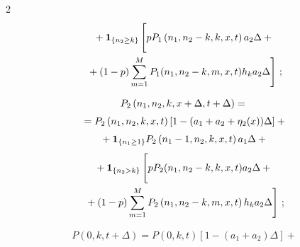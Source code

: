 \begin{multicols}{2}
\begin{multline}
{}+\mathbf{1}_{\{n_2\geq k\}}\left[


\vphantom{\sum\limits_{m=1}^{M}}


pP_1\left(n_1,n_2-k,k,x,t\right)a_2\Delta+{}\right.\\


\left.{}+(1-p)


\sum\limits_{m=1}^{M}P_1(n_1,n_2-k,m,x,t)h_k a_2\Delta\right]\,;\label{before1}


\end{multline}





\vspace*{-10pt}





\noindent


\begin{multline}


P_2\left(n_1,n_2,k,x+\Delta,t+\Delta\right)={}\\[3pt]


{}=


P_2\left(n_1,n_2,k,x,t\right)\left[1-(a_1+a_2+\eta_2(x))\Delta\right]+{}\\[3pt]


{}+\mathbf{1}_{\{n_1\geq 1\}}P_2\left(n_1-1,n_2,k,x,t\right)a_1\Delta+{}\\[3pt]


{}+\mathbf{1}_{\{n_2>k\}}\left[


\vphantom{\sum\limits_{m=1}^{M}}


pP_2(n_1,n_2-k,k,x,t)a_2\Delta+{}\right.\\


\left.{}+(1-p)


\sum\limits_{m=1}^{M}P_2\left(n_1,n_2-k,m,x,t\right)h_k a_2\Delta\right]\,;


\label{before2}


\end{multline}





\vspace*{-10pt}





\noindent


\begin{multline}


P\left(0,k,t+\Delta\right)=


P(0,k,t)\left[1-\left(a_1+a_2\right)\Delta\right]+{}\\



\end{multline}
\end{multicols}
